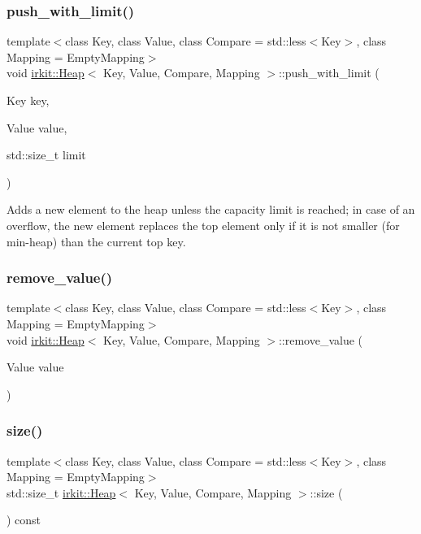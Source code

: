 \subsubsection{\texorpdfstring{push\+\_\+with\+\_\+limit()}{push\_with\_limit()}}
{\footnotesize\ttfamily template$<$class Key, class Value, class Compare = std\+::less$<$\+Key$>$, class Mapping = Empty\+Mapping$>$ \\
void \hyperlink{classirkit_1_1Heap}{irkit\+::\+Heap}$<$ Key, Value, Compare, Mapping $>$\+::push\+\_\+with\+\_\+limit (\begin{DoxyParamCaption}\item[{Key}]{key,  }\item[{Value}]{value,  }\item[{std\+::size\+\_\+t}]{limit }\end{DoxyParamCaption})\hspace{0.3cm}{\ttfamily [inline]}}

Adds a new element to the heap unless the capacity limit is reached; in case of an overflow, the new element replaces the top element only if it is not smaller (for min-\/heap) than the current top key. \mbox{\label{classirkit_1_1Heap_a0da9e0bc583dadad14b10d285e7a8925}} 
\subsubsection{\texorpdfstring{remove\+\_\+value()}{remove\_value()}}
{\footnotesize\ttfamily template$<$class Key, class Value, class Compare = std\+::less$<$\+Key$>$, class Mapping = Empty\+Mapping$>$ \\
void \hyperlink{classirkit_1_1Heap}{irkit\+::\+Heap}$<$ Key, Value, Compare, Mapping $>$\+::remove\+\_\+value (\begin{DoxyParamCaption}\item[{Value}]{value }\end{DoxyParamCaption})\hspace{0.3cm}{\ttfamily [inline]}}

\mbox{\label{classirkit_1_1Heap_acc53589d12325834624aa08573139227}} 
\subsubsection{\texorpdfstring{size()}{size()}}
{\footnotesize\ttfamily template$<$class Key, class Value, class Compare = std\+::less$<$\+Key$>$, class Mapping = Empty\+Mapping$>$ \\
std\+::size\+\_\+t \hyperlink{classirkit_1_1Heap}{irkit\+::\+Heap}$<$ Key, Value, Compare, Mapping $>$\+::size (\begin{DoxyParamCaption}{ }\end{DoxyParamCaption}) const\hspace{0.3cm}{\ttfamily [inline]}}

